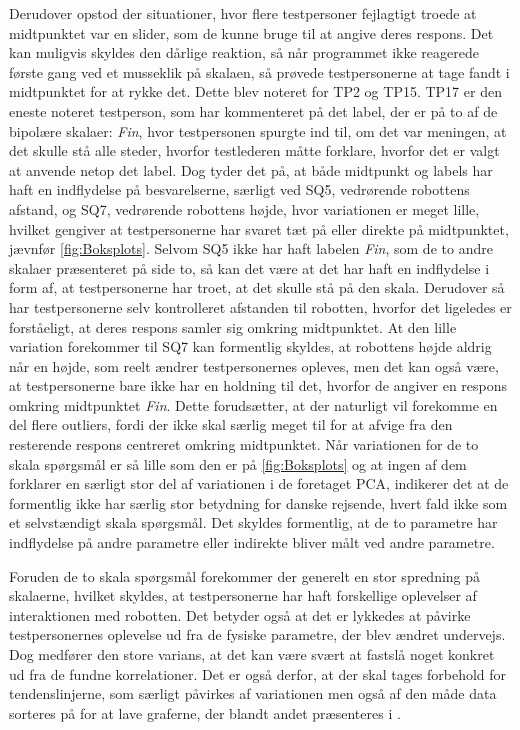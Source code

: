 Derudover opstod der situationer, hvor flere testpersoner fejlagtigt troede at midtpunktet var en slider, som de kunne bruge til at angive deres respons. Det kan muligvis skyldes den dårlige reaktion, så når programmet ikke reagerede første gang ved et musseklik på skalaen, så prøvede testpersonerne at tage fandt i midtpunktet for at rykke det. Dette blev noteret for TP2 og TP15.\blankline 
%
TP17 er den eneste noteret testperson, som har kommenteret på det label, der er på to af de bipolære skalaer: \textit{Fin}, hvor testpersonen spurgte ind til, om det var meningen, at det skulle stå alle steder, hvorfor testlederen måtte forklare, hvorfor det er valgt at anvende netop det label. Dog tyder det på, at både midtpunkt og labels har haft en indflydelse på besvarelserne, særligt ved SQ5, vedrørende robottens afstand, og SQ7, vedrørende robottens højde, hvor variationen er meget lille, hvilket gengiver at testpersonerne har svaret tæt på eller direkte på midtpunktet, jævnfør \autoref{fig:Boksplots}. Selvom SQ5 ikke har haft labelen \textit{Fin}, som de to andre skalaer præsenteret på side to, så kan det være at det har haft en indflydelse i form af, at testpersonerne har troet, at det skulle stå på den skala. Derudover så har testpersonerne selv kontrolleret afstanden til robotten, hvorfor det ligeledes er forståeligt, at deres respons samler sig omkring midtpunktet. At den lille variation forekommer til SQ7 kan formentlig skyldes, at robottens højde aldrig når en højde, som reelt ændrer testpersonernes opleves, men det kan også være, at testpersonerne bare ikke har en holdning til det, hvorfor de angiver en respons omkring midtpunktet \textit{Fin}. Dette forudsætter, at der naturligt vil forekomme en del flere outliers, fordi der ikke skal særlig meget til for at afvige fra den resterende respons centreret omkring midtpunktet. Når variationen for de to skala spørgsmål er så lille som den er på \autoref{fig:Boksplots} og at ingen af dem forklarer en særligt stor del af variationen i de foretaget PCA, indikerer det at de formentlig ikke har særlig stor betydning for danske rejsende, hvert fald ikke som et selvstændigt skala spørgsmål. Det skyldes formentlig, at de to parametre har indflydelse på andre parametre eller indirekte bliver målt ved andre parametre. 

Foruden de to skala spørgsmål forekommer der generelt en stor spredning på skalaerne, hvilket skyldes, at testpersonerne har haft forskellige oplevelser af interaktionen med robotten. Det betyder også at det er lykkedes at påvirke testpersonernes oplevelse ud fra de fysiske parametre, der blev ændret undervejs. Dog medfører den store varians, at det kan være svært at fastslå noget konkret ud fra de fundne korrelationer. Det er også derfor, at der skal tages forbehold for tendenslinjerne, som særligt påvirkes af variationen men også af den måde data sorteres på for at lave graferne, der blandt andet præsenteres i . 
%



